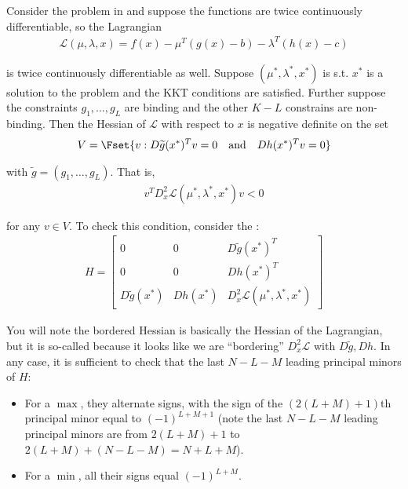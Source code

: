 \documentclass{article}
\begin{document}
Consider the problem in  and suppose the functions are twice continuously differentiable, so the Lagrangian
\begin{align*}
  \mathcal{L}(\mu, \lambda, x) = f(x) - \mu^T (g(x) - b) - \lambda^T (h(x) - c)
\end{align*}

is twice continuously differentiable as well. Suppose $(\mu^*, \lambda^*, x^*)$ is s.t. $x^*$ is a solution to the problem and the KKT conditions are satisfied. Further suppose the constraints $g_1, \ldots, g_L$ are binding and the other $K - L$ constrains are non-binding. Then the Hessian of $\mathcal{L}$ with respect to $x$ is negative definite on the set
\begin{align*}
  V = \Fset{v: D \widetilde{g}(x^*)^T v = 0 \quad\text{and}\quad Dh(x^*)^T v = 0}
\end{align*}

with $\widetilde{g} = (g_1, \ldots, g_L)$. That is,
\begin{align*}
  v^T D^2_x \mathcal{L}(\mu^*, \lambda^*, x^*) v < 0
\end{align*}

for any $v \in V$. To check this condition, consider the :
\begin{align*}
  H
  =
  \begin{bmatrix}
    0                    & 0        & D \widetilde{g}(x^*)^T \\
    0                    & 0        & D h(x^*)^T \\
    D \widetilde{g}(x^*) & D h(x^*) & D^2_x \mathcal{L}(\mu^*, \lambda^*, x^*)
  \end{bmatrix}
\end{align*}

You will note the bordered Hessian is basically the Hessian of the Lagrangian, but it is so-called because it looks like we are ``bordering'' $D^2_x \mathcal{L}$ with $D \widetilde{g}, Dh$. In any case, it is sufficient to check that the last $N - L - M$ leading principal minors of $H$:
\begin{itemize}[label=$\bullet$]
  \item For a $\max$, they alternate signs, with the sign of the $(2(L + M) + 1)$th principal minor equal to $(-1)^{L + M + 1}$ (note the last $N - L - M$ leading principal minors are from $2(L + M) + 1$ to $2(L + M) + (N - L - M) = N + L + M$).
  \item For a $\min$, all their signs equal $(-1)^{L + M}$.
\end{itemize}
\end{document}
